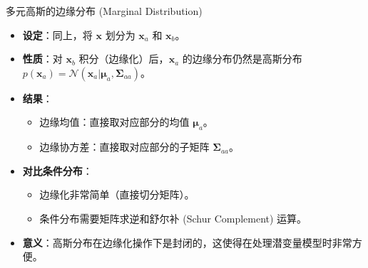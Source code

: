 \documentclass[12pt, aspectratio=169]{beamer}
\newcommand{\vect}[1]{\mathbf{#1}}
\newcommand{\N}{\mathcal{N}}
\begin{document}
\begin{frame}{多元高斯的边缘分布 (Marginal Distribution)}
    \begin{itemize}
        \item \textbf{设定}：同上，将 $\vect{x}$ 划分为 $\vect{x}_a$ 和 $\vect{x}_b$。
        \item \textbf{性质}：对 $\vect{x}_b$ 积分（边缘化）后，$\vect{x}_a$ 的边缘分布仍然是高斯分布 $p(\vect{x}_a) = \N(\vect{x}_a | \boldsymbol{\mu}_a, \boldsymbol{\Sigma}_{aa})$。
        \item \textbf{结果}：
        \begin{itemize}
            \item 边缘均值：直接取对应部分的均值 $\boldsymbol{\mu}_a$。
            \item 边缘协方差：直接取对应部分的子矩阵 $\boldsymbol{\Sigma}_{aa}$。
        \end{itemize}
        \item \textbf{对比条件分布}：
        \begin{itemize}
            \item 边缘化非常简单（直接切分矩阵）。
            \item 条件分布需要矩阵求逆和舒尔补 (Schur Complement) 运算。
        \end{itemize}
        \item \textbf{意义}：高斯分布在边缘化操作下是封闭的，这使得在处理潜变量模型时非常方便。
    \end{itemize}
\end{frame}
\end{document}

